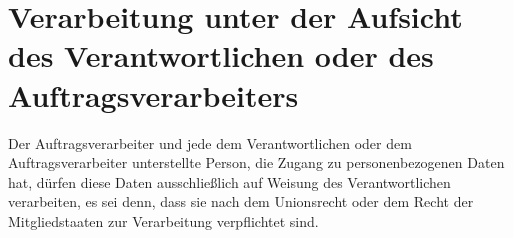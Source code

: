 \chapter{Verarbeitung unter der Aufsicht des Verantwortlichen oder des Auftragsverarbeiters}
\label{ch:29}


Der Auftragsverarbeiter und jede dem Verantwortlichen oder dem Auftragsverarbeiter unterstellte Person, die Zugang zu
personenbezogenen Daten hat, dürfen diese Daten ausschließlich auf Weisung des Verantwortlichen verarbeiten, es sei
denn, dass sie nach dem Unionsrecht oder dem Recht der Mitgliedstaaten zur Verarbeitung verpflichtet sind.



